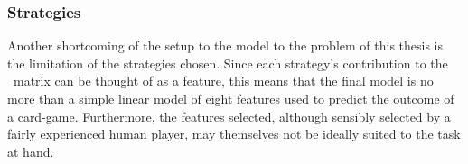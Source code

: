 
\subsubsection*{Strategies}
\label{sec:disc-shortcomings-strategies}


Another shortcoming of the setup to the model to the problem of this thesis is
the limitation of the strategies chosen.
%
Since each strategy's contribution to the \Smat\ matrix can be thought of as
a feature,
this means that the final model is no more than a simple linear model of
eight features
used to predict the outcome of a card-game.
%
Furthermore,
the features selected,
although sensibly selected by a fairly experienced human player,
may themselves not be ideally suited to the task at hand.

